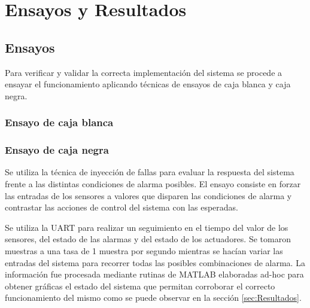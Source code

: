
\chapter{Ensayos y Resultados} %

\label{Chapter4} %


\section{Ensayos}

Para verificar y validar la correcta implementación del sistema se procede a ensayar el funcionamiento aplicando técnicas de ensayos de caja blanca y caja negra.
\subsection{Ensayo de caja blanca}




\subsection{Ensayo de caja negra}

Se utiliza la técnica de inyección de fallas para evaluar la respuesta del sistema frente a las distintas condiciones de alarma posibles.  El ensayo consiste en forzar las entradas de los sensores a valores que disparen las condiciones de alarma y contrastar las acciones de control del sistema con las esperadas.

Se utiliza la UART para realizar un seguimiento en el tiempo del valor de los sensores, del estado de las alarmas y del estado de los actuadores. Se tomaron muestras a una tasa de 1 muestra por segundo mientras se hacían variar las entradas del sistema para recorrer todas las posibles combinaciones de alarma. La información fue procesada mediante rutinas de MATLAB elaboradas ad-hoc para obtener gráficas el estado del sistema que permitan corroborar el correcto funcionamiento del mismo como se puede observar en la sección \ref{sec:Resultados}. 

